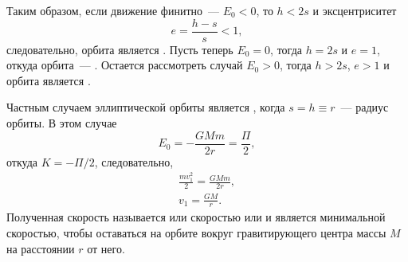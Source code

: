 Таким образом, если движение финитно~--- $E_0 < 0$, то $h < 2s$ и эксцентриситет
\begin{equation*}
     e = \frac{h-s}{s} < 1,
\end{equation*}
следовательно, орбита является . Пусть теперь $E_0=0$, тогда $h = 2s$ и $e = 1$, откуда орбита~--- . Остается рассмотреть случай $E_0 > 0$, тогда $h > 2s$, $e > 1$ и орбита является .
 
Частным случаем эллиптической орбиты является , когда $s = h \equiv r$~--- радиус орбиты. В этом случае 
\begin{equation*}
    E_0 = -\frac{GMm}{2r} = \frac{\Pi}{2},
\end{equation*}
откуда $K = - \Pi / 2$, следовательно,
\begin{gather}
    \frac{m v_1^2}{2} = \frac{GMm}{2r}, \nonumber \\
    v_1 = \frac{GM}{r}.
    \label{eq:circle-speed}
\end{gather} 
Полученная скорость называется  или  скоростью или и является минимальной скоростью, чтобы оставаться на орбите вокруг гравитирующего центра массы $M$ на расстоянии $r$ от него.
 
 